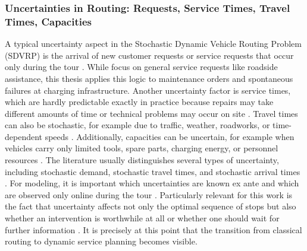 \documentclass[12pt,oneside]{article}
\begin{document}
\subsubsection{Uncertainties in Routing: Requests, Service Times, Travel Times, Capacities}
A typical uncertainty aspect in the Stochastic Dynamic Vehicle Routing Problem (SDVRP) is the arrival of new customer requests or service requests that occur only during the tour \citep{zou2018look}. While \citet{ulmer2019offline} focus on general service requests like roadside assistance, this thesis applies this logic to maintenance orders and spontaneous failures at charging infrastructure.
Another uncertainty factor is service times, which are hardly predictable exactly in practice because repairs may take different amounts of time or technical problems may occur on site \citep{akhmetbek2023stochastic}. Travel times can also be stochastic, for example due to traffic, weather, roadworks, or time-dependent speeds \citep{mardevsic2023review}. Additionally, capacities can be uncertain, for example when vehicles carry only limited tools, spare parts, charging energy, or personnel resources \citep{basso2022dynamic}.
The literature usually distinguishes several types of uncertainty, including stochastic demand, stochastic travel times, and stochastic arrival times \citep{ulmer2018budgeting}. For modeling, it is important which uncertainties are known ex ante and which are observed only online during the tour \citep{ulmer2019offline}.
Particularly relevant for this work is the fact that uncertainty affects not only the optimal sequence of stops but also whether an intervention is worthwhile at all or whether one should wait for further information \citep{ulmer2019offline}. It is precisely at this point that the transition from classical routing to dynamic service planning becomes visible.
\end{document}
